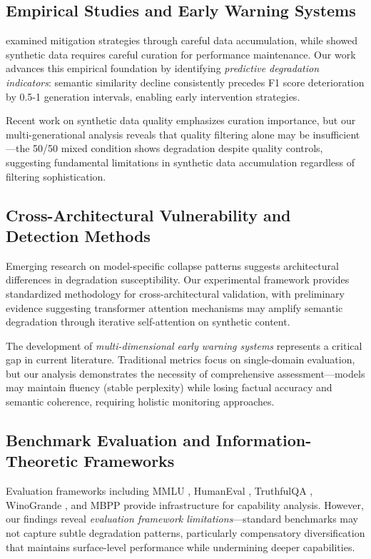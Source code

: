 \documentclass{article}
\begin{document}
\subsection{Empirical Studies and Early Warning Systems}

\citet{gerstgrasser2024model} examined mitigation strategies through careful data accumulation, while \citet{borji2022pros} showed synthetic data requires careful curation for performance maintenance. Our work advances this empirical foundation by identifying \textit{predictive degradation indicators}: semantic similarity decline consistently precedes F1 score deterioration by 0.5-1 generation intervals, enabling early intervention strategies.

Recent work on synthetic data quality \citep{schaeffer2024training} emphasizes curation importance, but our multi-generational analysis reveals that quality filtering alone may be insufficient—the 50/50 mixed condition shows degradation despite quality controls, suggesting fundamental limitations in synthetic data accumulation regardless of filtering sophistication.

\subsection{Cross-Architectural Vulnerability and Detection Methods}

Emerging research on model-specific collapse patterns \citep{bertrand2024stability} suggests architectural differences in degradation susceptibility. Our experimental framework provides standardized methodology for cross-architectural validation, with preliminary evidence suggesting transformer attention mechanisms may amplify semantic degradation through iterative self-attention on synthetic content.

The development of \textit{multi-dimensional early warning systems} represents a critical gap in current literature. Traditional metrics focus on single-domain evaluation, but our analysis demonstrates the necessity of comprehensive assessment—models may maintain fluency (stable perplexity) while losing factual accuracy and semantic coherence, requiring holistic monitoring approaches.

\subsection{Benchmark Evaluation and Information-Theoretic Frameworks}

Evaluation frameworks including MMLU \citep{hendrycks2020measuring}, HumanEval \citep{chen2021evaluating}, TruthfulQA \citep{lin2022truthfulqa}, WinoGrande \citep{sakaguchi2020winogrande}, and MBPP \citep{austin2021program} provide infrastructure for capability analysis. However, our findings reveal \textit{evaluation framework limitations}—standard benchmarks may not capture subtle degradation patterns, particularly compensatory diversification that maintains surface-level performance while undermining deeper capabilities.
\end{document}
